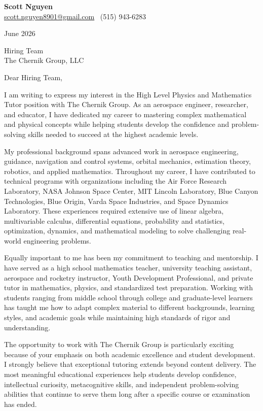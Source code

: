\documentclass[11pt]{article}
\begin{document}
	
	\begin{center}
		{\Large\bfseries\color{mygreen} Scott Nguyen}\\[4pt]
		\href{mailto:scott.nguyen8901@gmail.com}{scott.nguyen8901@gmail.com} \textbar\ (515) 943-6283
	\end{center}
	
	\vspace{0.2in}
	
	June 2026
	
	Hiring Team \\
	The Chernik Group, LLC
	
	\vspace{0.1in}
	
	Dear Hiring Team,
	
	I am writing to express my interest in the High Level Physics and Mathematics Tutor position with The Chernik Group. As an aerospace engineer, researcher, and educator, I have dedicated my career to mastering complex mathematical and physical concepts while helping students develop the confidence and problem-solving skills needed to succeed at the highest academic levels.
	
	My professional background spans advanced work in aerospace engineering, guidance, navigation and control systems, orbital mechanics, estimation theory, robotics, and applied mathematics. Throughout my career, I have contributed to technical programs with organizations including the Air Force Research Laboratory, NASA Johnson Space Center, MIT Lincoln Laboratory, Blue Canyon Technologies, Blue Origin, Varda Space Industries, and Space Dynamics Laboratory. These experiences required extensive use of linear algebra, multivariable calculus, differential equations, probability and statistics, optimization, dynamics, and mathematical modeling to solve challenging real-world engineering problems.
	
	Equally important to me has been my commitment to teaching and mentorship. I have served as a high school mathematics teacher, university teaching assistant, aerospace and rocketry instructor, Youth Development Professional, and private tutor in mathematics, physics, and standardized test preparation. Working with students ranging from middle school through college and graduate-level learners has taught me how to adapt complex material to different backgrounds, learning styles, and academic goals while maintaining high standards of rigor and understanding.
	
	The opportunity to work with The Chernik Group is particularly exciting because of your emphasis on both academic excellence and student development. I strongly believe that exceptional tutoring extends beyond content delivery. The most meaningful educational experiences help students develop confidence, intellectual curiosity, metacognitive skills, and independent problem-solving abilities that continue to serve them long after a specific course or examination has ended.
	
\end{document}
